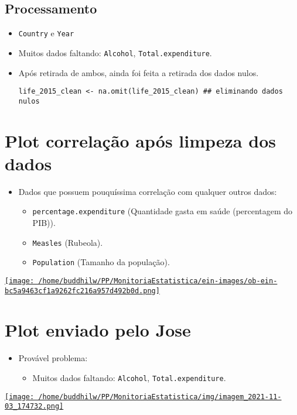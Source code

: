\documentclass[11pt]{article}
\begin{document}
\subsection{Processamento}
\label{sec:orgdd05811}
\begin{itemize}
\item \texttt{Country} e \texttt{Year}
\item Muitos dados faltando: \texttt{Alcohol}, \texttt{Total.expenditure}.
\item Após retirada de ambos, ainda foi feita a retirada dos dados nulos.

\begin{verbatim}
life_2015_clean <- na.omit(life_2015_clean) ## eliminando dados nulos
\end{verbatim}
\end{itemize}

\clearpage
\section{Plot correlação após limpeza dos dados}
\label{sec:orgf491ae7}
\begin{itemize}
\item Dados que possuem pouquíssima correlação com qualquer outros dados:
\begin{itemize}
\item \texttt{percentage.expenditure} (Quantidade gasta em saúde (percentagem do PIB)).
\item \texttt{Measles} (Rubeola).
\item \texttt{Population} (Tamanho da população).
\end{itemize}
\end{itemize}

\href{ein-images/ob-ein-bc5a9463cf1a9262fc216a957d492b0d.png}{\texttt{[image: /home/buddhilw/PP/MonitoriaEstatistica/ein-images/ob-ein-bc5a9463cf1a9262fc216a957d492b0d.png]}}
\clearpage
\section{Plot enviado pelo Jose}
\label{sec:org2df2883}
\begin{itemize}
\item Provável problema:
\begin{itemize}
\item Muitos dados faltando: \texttt{Alcohol}, \texttt{Total.expenditure}.
\end{itemize}
\end{itemize}

\href{img/imagem\_2021-11-03\_174732.png}{\texttt{[image: /home/buddhilw/PP/MonitoriaEstatistica/img/imagem\_2021-11-03\_174732.png]}}
\end{document}
